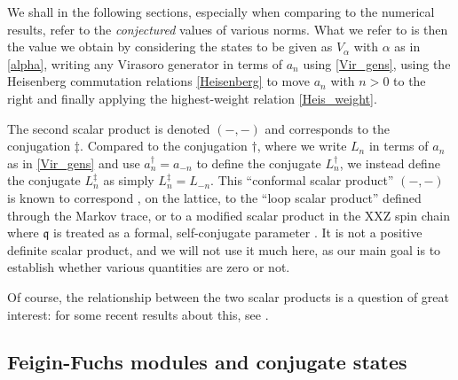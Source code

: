 \documentclass[a4paper,10pt]{article}
\newcommand{\q}{\mathfrak{q}}
\newcommand{\linnea}[1]{$\framebox{\tiny L}$\ \textbf{\texttt{{\color{red}\footnotesize#1}}}}
\newcommand{\jesper}[1]{$\framebox{\tiny J}$\ \textbf{\texttt{{\color{cyan}\footnotesize#1}}}}
\newcommand{\spindagger}{\dag}
\newcommand{\loopdagger}{\ddag}
\newcommand{\loopinner}[2]{( #1, #2 )}
\begin{document}
We shall in the following sections, especially when comparing to the numerical results, refer to the \emph{conjectured} values of various norms. What we refer to is then the value we obtain by considering the states to be given as $V_\alpha$ with $\alpha$ as in \eqref{alpha}, writing any Virasoro generator in terms of $a_n$ using \eqref{Vir_gens}, using the Heisenberg commutation relations \eqref{Heisenberg} to move $a_n$ with $n>0$ to the right and finally applying the highest-weight relation \eqref{Heis_weight}. %

The second scalar product is denoted $\loopinner{-}{-}$ and corresponds to the conjugation $\loopdagger$. Compared to the conjugation $\spindagger$, where we write $L_n$ in terms of $a_n$ as in \eqref{Vir_gens} and use $a_n^\dag = a_{-n}$ to define the conjugate $L_n^\spindagger$, we instead define the conjugate $L_n^\loopdagger$ as simply $L^\loopdagger_n = L_{-n}$. This ``conformal scalar product'' $\loopinner{-}{-}$ 
is known to correspond \cite{DJS,VJS,VGJS}, on the lattice, to the ``loop scalar product'' defined through the Markov trace,
or to a modified scalar product in the XXZ spin chain where $\q$ is treated as a formal, self-conjugate parameter \cite{CJS}.
It is not a positive definite scalar product, and we will not use it much here, as our main goal is to establish whether various quantities are zero or not. 

Of course, the relationship between the two scalar products is a question of great interest: for some recent results about this, see \cite{Gleb}.


\subsection{Feigin-Fuchs modules and conjugate states}\label{FF_modules}
\end{document}
